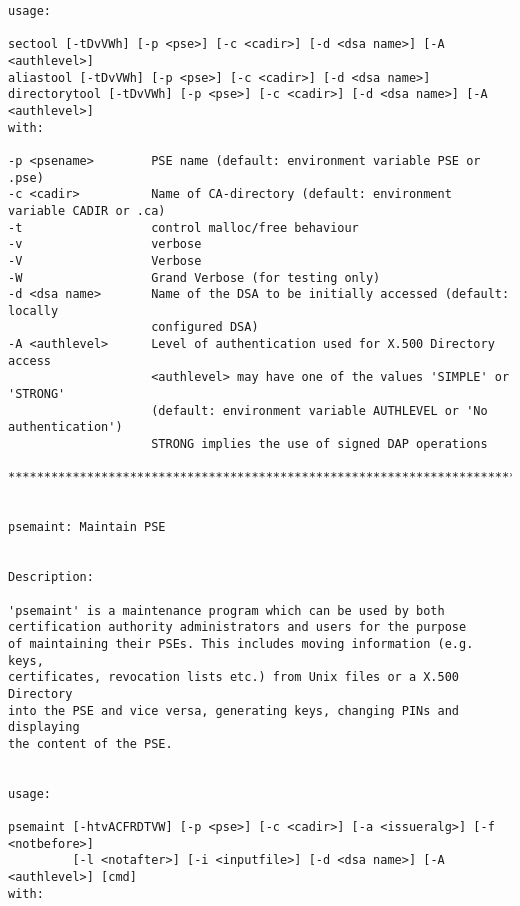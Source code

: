 {\begin{verbatim}
usage:

sectool [-tDvVWh] [-p <pse>] [-c <cadir>] [-d <dsa name>] [-A <authlevel>]
aliastool [-tDvVWh] [-p <pse>] [-c <cadir>] [-d <dsa name>]
directorytool [-tDvVWh] [-p <pse>] [-c <cadir>] [-d <dsa name>] [-A <authlevel>]
with:

-p <psename>        PSE name (default: environment variable PSE or .pse)
-c <cadir>          Name of CA-directory (default: environment variable CADIR or .ca)
-t                  control malloc/free behaviour
-v                  verbose
-V                  Verbose
-W                  Grand Verbose (for testing only)
-d <dsa name>       Name of the DSA to be initially accessed (default: locally 
                    configured DSA)
-A <authlevel>      Level of authentication used for X.500 Directory access
                    <authlevel> may have one of the values 'SIMPLE' or 'STRONG'
                    (default: environment variable AUTHLEVEL or 'No authentication')
                    STRONG implies the use of signed DAP operations

****************************************************************************************


psemaint: Maintain PSE


Description:

'psemaint' is a maintenance program which can be used by both
certification authority administrators and users for the purpose
of maintaining their PSEs. This includes moving information (e.g. keys,
certificates, revocation lists etc.) from Unix files or a X.500 Directory
into the PSE and vice versa, generating keys, changing PINs and displaying
the content of the PSE.


usage:

psemaint [-htvACFRDTVW] [-p <pse>] [-c <cadir>] [-a <issueralg>] [-f <notbefore>] 
         [-l <notafter>] [-i <inputfile>] [-d <dsa name>] [-A <authlevel>] [cmd]
with:


\end{verbatim}}
